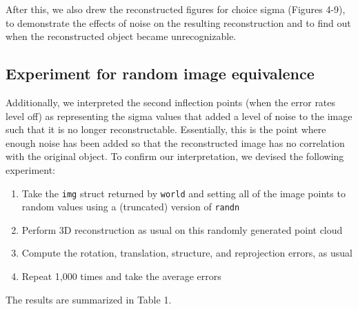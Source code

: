 \documentclass{article}
\begin{document}
After this, we also drew the reconstructed figures for choice sigma (Figures 4-9), to demonstrate the effects of noise on the resulting reconstruction and to find out when the reconstructed object became unrecognizable.

\subsection*{Experiment for random image equivalence}

Additionally, we interpreted the second inflection points (when the error rates level off) as representing the sigma values that added a level of noise to the image such that it is no longer reconstructable. Essentially, this is the point where enough noise has been added so that the reconstructed image has no correlation with the original object. To confirm our interpretation, we devised the following experiment:

\begin{enumerate}
\item
Take the \texttt{img} struct returned by \texttt{world} and setting all of the image points to random values using a (truncated) version of \texttt{randn}
\item
Perform 3D reconstruction as usual on this randomly generated point cloud
\item
Compute the rotation, translation, structure, and reprojection errors, as usual
\item
Repeat 1,000 times and take the average errors
\end{enumerate}

The results are summarized in Table 1.


\end{document}

